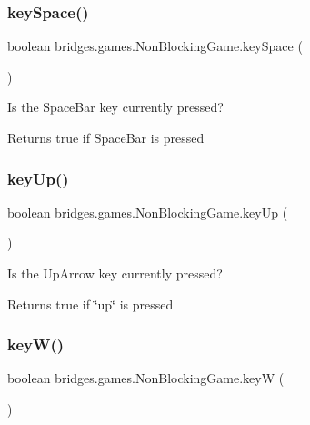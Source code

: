 \subsubsection{\texorpdfstring{keySpace()}{keySpace()}}
{\footnotesize\ttfamily boolean bridges.\+games.\+Non\+Blocking\+Game.\+key\+Space (\begin{DoxyParamCaption}{ }\end{DoxyParamCaption})\hspace{0.3cm}{\ttfamily [protected]}}



Is the Space\+Bar key currently pressed? 

\begin{DoxyReturn}{Returns}
true if Space\+Bar is pressed 
\end{DoxyReturn}
\mbox{\label{classbridges_1_1games_1_1_non_blocking_game_a524c340fabec1b7a69aa742e1347b7b4}} 
\subsubsection{\texorpdfstring{keyUp()}{keyUp()}}
{\footnotesize\ttfamily boolean bridges.\+games.\+Non\+Blocking\+Game.\+key\+Up (\begin{DoxyParamCaption}{ }\end{DoxyParamCaption})\hspace{0.3cm}{\ttfamily [protected]}}



Is the Up\+Arrow key currently pressed? 

\begin{DoxyReturn}{Returns}
true if \char`\"{}up\char`\"{} is pressed 
\end{DoxyReturn}
\mbox{\label{classbridges_1_1games_1_1_non_blocking_game_a45db18869044968a233a6f217650e34d}} 
\subsubsection{\texorpdfstring{keyW()}{keyW()}}
{\footnotesize\ttfamily boolean bridges.\+games.\+Non\+Blocking\+Game.\+keyW (\begin{DoxyParamCaption}{ }\end{DoxyParamCaption})\hspace{0.3cm}{\ttfamily [protected]}}



